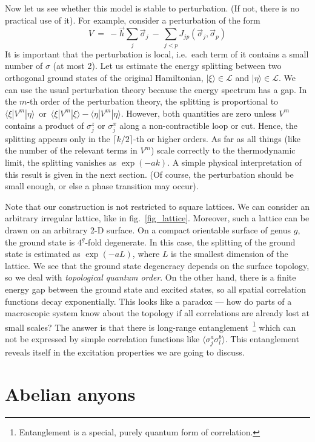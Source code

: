 \documentclass[12pt]{article}
\newcommand{\calL}{\mathcal{L}}
\begin{document}
Now let us see whether this model is stable to perturbation. (If not, there is
no practical use of it). For example, consider a perturbation of the form
\[
  V\ =\ -\vec{h}\sum_j\vec{\sigma}_j\ -\ 
  \sum_{j<p}J_{jp}(\vec{\sigma}_j,\vec{\sigma}_p)
\]
It is important that the perturbation is local, i.e.\ each term of it contains
a small number of $\sigma$ (at most 2). Let us estimate the energy splitting 
between two orthogonal ground states of the original Hamiltonian, 
$|\xi\rangle\in\calL$ and $|\eta\rangle\in\calL$. We can use the usual 
perturbation theory because the energy spectrum has a gap. In the $m$-th order 
of the perturbation theory, the splitting is proportional to\, 
$\langle\xi|V^m|\eta\rangle$\, or\, 
$\langle\xi|V^m|\xi\rangle-\langle\eta|V^m|\eta\rangle$. However, both 
quantities are zero unless $V^m$ contains a product of $\sigma^z_j$ or 
$\sigma^x_j$ along a non-contractible loop or cut. Hence, the splitting 
appears only in the $\lceil k/2\rceil$-th or higher orders. As far as all 
things (like the number of the relevant terms in $V^m$) scale correctly to 
the thermodynamic limit, the splitting vanishes as $\exp(-ak)$. A simple 
physical interpretation of this result is given in the next section.
(Of course, the perturbation should be small enough, or else a phase 
transition may occur).

Note that our construction is not restricted to square lattices. We can 
consider an arbitrary irregular lattice, like in fig.~\ref{fig_lattice}. 
Moreover, such a lattice can be drawn on an arbitrary 2-D surface. On a
compact orientable surface of genus $g$, the ground state is $4^g$-fold 
degenerate. In this case, the splitting of the ground state is estimated as 
$\exp(-aL)$, where $L$ is the smallest dimension of the lattice. We see that 
the ground state degeneracy depends on the surface topology, so we deal with 
\emph{topological quantum order}. On the other hand, there is a finite energy 
gap between the ground state and excited states, so all spatial correlation 
functions decay exponentially. This looks like a paradox --- 
how do parts of a macroscopic system know about the topology if all 
correlations are already lost at small scales? The answer is that there 
is long-range entanglement~\footnote{
 Entanglement is a special, purely quantum form of correlation.} 
which can not be expressed by simple correlation functions like 
$\langle\sigma^a_j\sigma^b_l\rangle$. This entanglement reveals itself in the 
excitation properties we are going to discuss.


\section{Abelian anyons} \label{sec_abanyons}
\end{document}
